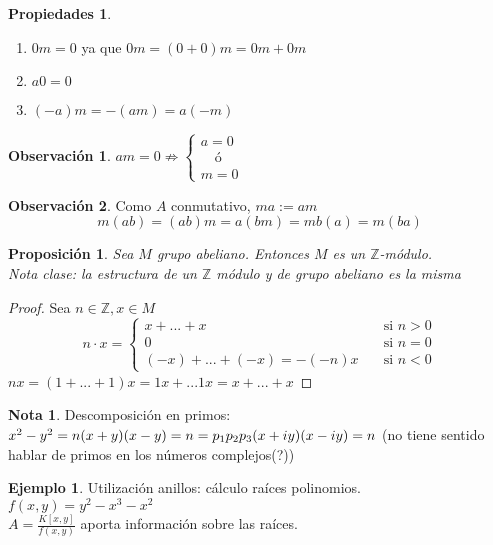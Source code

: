 \documentclass{article}
\theoremstyle{theorem-style}  %
\newtheorem{proposition}[theorem]{Proposición}
\theoremstyle{definition}
\newtheorem*{note}{Nota} %
\newtheorem*{observation}{Observación} %
\newtheorem*{properties}{Propiedades}
\newtheorem*{comment}{Comentario clase}
\theoremstyle{example-style}
\newtheorem{example}{Ejemplo}[section]
\begin{document}
    \begin{properties}
    	\
    	\begin{enumerate}
    		\item $0m=0$ ya que $0m=(0+0)m=0m+0m$
    		\item $a0=0$
    		\item $(-a)m=-(am)=a(-m)$
    	\end{enumerate}
    \end{properties}
\begin{observation}
	$am=0 \nRightarrow \begin{cases}
	a=0\\
	\quad\text{ó}\\
	m=0
	\end{cases}$
\end{observation}
\begin{observation}
	Como $A$ conmutativo, $ma:=am$
	\[m(ab)=(ab)m=a(bm)=mb(a)=m(ba)\]
\end{observation}
\begin{proposition}
	Sea $M$ grupo abeliano.
	Entonces $M$ es un $\mathbb{Z}$-módulo.
	\\Nota clase: la estructura de un $\mathbb{Z}$ módulo y de grupo abeliano es la misma
\end{proposition}
\begin{proof}
	Sea $n \in \mathbb{Z}, x\in M$
	\[n\cdot x= \begin{cases}
		x+...+x&\quad \text{si }n>0\\
		0 &\quad \text{si } n=0\\
		(-x)+...+(-x)=-(-n)x &\quad \text{si }n<0
	\end{cases}
	 \]
	$nx=(1+...+1)x=1x+...1x=x+...+x$
\end{proof}
\begin{note}
	Descomposición en primos:\\
	$x^2-y^2=n \\
	(x+y)(x-y)=n=p_1 p_2 p_3 \\
	(x+iy)(x-iy)=n $ (no tiene sentido hablar de primos en los números complejos(?))
\end{note}

\begin{example}
	Utilización anillos: cálculo raíces polinomios.\\
	$f(x,y)=y^2-x^3-x^2 $ \\
	$A=\frac{K[x,y]}{f(x,y)}$ aporta información sobre las raíces.
\end{example}

\begin{comment}
	¿Cual es la motivación de estudiar los módulos? \\
	Aparecen en representaciones de grupos:	Sabiendo los módulos de un anillo, se puede saber como es un anillo.\\
	Otra razón (se ve en el máster): Si un anillo es regular, es útil en el estudio de puntos no singulares.\\
	Cada punto de la curva esta determinado por un anillo. Si algunos anillos son regulares, otros también lo son. Es un vago ejemplo de que los módulos tienen utilidad.
\end{comment}
\end{document}
